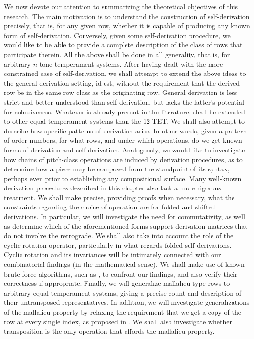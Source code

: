 We now devote our attention to summarizing the theoretical objectives of this research. The main motivation is to understand the construction of self-derivation precisely, that is, for any given row, whether it is capable of producing any known form of self-derivation. Conversely, given some self-derivation procedure, we would like to be able to provide a complete description of the class of rows that participate therein. All the above shall be done in all generality, that is, for arbitrary $n$-tone temperament systems. After having dealt with the more constrained case of self-derivation, we shall attempt to extend the above ideas to the general derivation setting, id est, without the requirement that the derived row be in the same row class as the originating row. General derivation is less strict and better understood than self-derivation, but lacks the latter's potential for cohesiveness. Whatever is already present in the literature, shall be extended to other equal temperament systems than the 12-TET. We shall also attempt to describe how specific patterns of derivation arise. In other words, given a pattern of order numbers, for what rows, and under which operations, do we get known forms of derivation and self-derivation. Analogously, we would like to investigate how chains of pitch-class operations are induced by derivation procedures, as to determine how a piece may be composed from the standpoint of its syntax, perhaps even prior to establishing any compositional surface. Many well-known derivation procedures described in this chapter also lack a more rigorous treatment. We shall make precise, providing proofs when necessary, what the constraints regarding the choice of operation are for folded and shifted derivations. In particular, we will investigate the need for commutativity, as well as determine which of the aforementioned forms support derivation matrices that do not involve the retrograde. We shall also take into account the role of the cyclic rotation operator, particularly in what regards folded self-derivations. Cyclic rotation and its invariances will be intimately connected with our combinatorial findings (in the mathematical sense). We shall make use of known brute-force algorithms, such as \cite{Kowalski1987b}, to confront our findings, and also verify their correctness if appropriate. Finally, we will generalize mallalieu-type rows to arbitrary equal temperament systems, giving a precise count and description of their untransposed representatives. In addition, we will investigate generalizations of the mallalieu property by relaxing the requirement that we get a copy of the row at every single index, as proposed in \cite{Mead1989}. We shall also investigate whether transposition is the only operation that affords the mallalieu property.

